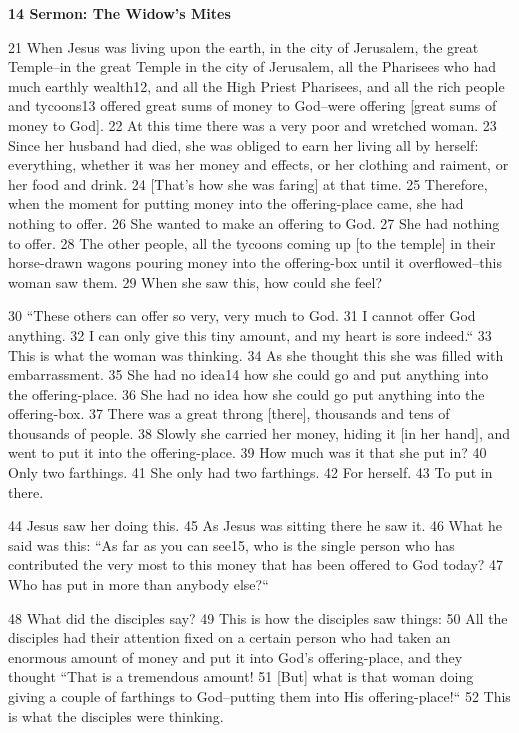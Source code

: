 
\textbf{14 Sermon: The Widow's Mites}

21 When Jesus was living upon the earth, in the city of Jerusalem, the great Temple--in
the great Temple in the city of Jerusalem, all the Pharisees who had much earthly
wealth12, and all the High Priest Pharisees, and all the rich people and tycoons13
offered great sums of money to God--were offering [great sums of money to God].
22 At this time there was a very poor and wretched woman. 23 Since her husband
had died, she was obliged to earn her living all by herself: everything, whether
it was her money and effects, or her clothing and raiment, or her food and drink.
24 [That's how she was faring] at that time. 25 Therefore, when the moment for
putting money into the offering-place came, she had nothing to offer. 26 She wanted
to make an offering to God. 27 She had nothing to offer. 28 The other people, all
the tycoons coming up [to the temple] in their horse-drawn wagons pouring money
into the offering-box until it overflowed--this woman saw them. 29 When she saw
this, how could she feel?

30 ``These others can offer so very, very much to God. 31 I cannot offer
God anything. 32 I can only give this tiny amount, and my heart is sore indeed.``
33 This is what the woman was thinking. 34 As she thought this she was filled with
embarrassment. 35 She had no idea14 how she could go and put anything into the
offering-place. 36 She had no idea how she could go put anything into the offering-box.
37 There was a great throng [there], thousands and tens of thousands of people.
38 Slowly she carried her money, hiding it [in her hand], and went to put it into
the offering-place. 39 How much was it that she put in? 40 Only two farthings.
41 She only had two farthings. 42 For herself. 43 To put in there.

44 Jesus saw her doing this. 45 As Jesus was sitting there he saw it. 46 What he
said was this: ``As far as you can see15, who is the single person who
has contributed the very most to this money that has been offered to God today?
47 Who has put in more than anybody else?``

48 What did the disciples say? 49 This is how the disciples saw things: 50 All
the disciples had their attention fixed on a certain person who had taken an enormous
amount of money and put it into God's offering-place, and they thought ``That
is a tremendous amount! 51 [But] what is that woman doing giving a couple of farthings
to God--putting them into His offering-place!`` 52 This is what the disciples
were thinking.

